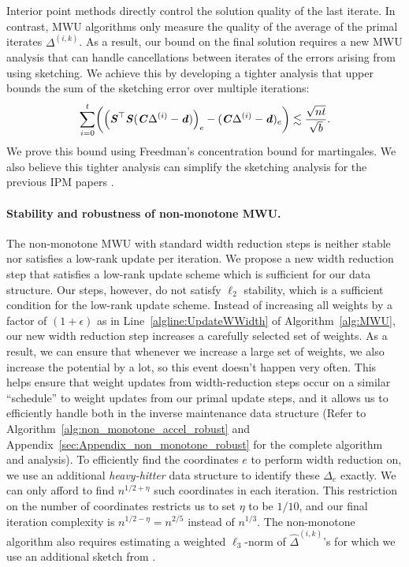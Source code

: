 \documentclass[11pt]{article}
\let\originalleft\left
\let\originalright\right
\renewcommand{\left}{\mathopen{}\mathclose\bgroup\originalleft}
\renewcommand{\right}{\aftergroup\egroup\originalright}
\newcommand\dd{\boldsymbol{\mathit{d}}}
\newcommand\CC{\boldsymbol{\mathit{C}}}
\renewcommand\SS{\boldsymbol{\mathit{S}}}
\newcommand{\wh}{\widehat}
\begin{document}
Interior point methods directly control the solution quality of the last iterate.
In contrast, MWU algorithms only 
measure the quality of the average of the primal iterates $\Delta^{(i,k)}$. 
As a result, our bound on the final solution requires a new MWU analysis that can handle cancellations between iterates of the errors arising from using sketching. 
We achieve this by developing a tighter analysis that upper bounds the sum of the sketching error over multiple iterations:
\[
\sum_{i=0}^t \left( \Big(\SS^{\top} \SS (\CC\Delta^{(i)}-\dd)\Big)_e - (\CC\Delta^{(i)}-\dd)_e\right) \lesssim \frac{\sqrt{n t}}{\sqrt{b}}.
\]
We prove this bound using Freedman's concentration bound for martingales. We also believe this tighter analysis can simplify the sketching analysis for the previous IPM papers \cite{cohen2021solving, lsz19, jiang2021faster}.



\paragraph{Stability and robustness of non-monotone MWU.}
The non-monotone MWU with standard width reduction steps is neither stable nor satisfies a low-rank update per iteration. We propose a new width reduction step that satisfies a low-rank update scheme which is sufficient for our data structure. Our steps, however, do not satisfy $\ell_2$ stability, which is a sufficient condition for the low-rank update scheme. Instead of increasing all weights by a factor of $(1+\epsilon)$ as in Line~\ref{algline:UpdateWWidth} of Algorithm~\ref{alg:MWU}, our new width reduction step increases a carefully selected set of weights. As a result, we can ensure that whenever we increase a large set of weights, we also increase the potential by a lot, so this event doesn't happen very often. This helps ensure that weight updates from width-reduction steps occur on a similar ``schedule'' to weight updates from our primal update steps, and it allows us to efficiently handle both in the inverse maintenance data structure (Refer to Algorithm~\ref{alg:non_monotone_accel_robust} and Appendix~\ref{sec:Appendix_non_monotone_robust} for the complete algorithm and analysis).
To efficiently find the coordinates $e$ to perform width reduction on, we use an additional {\it heavy-hitter} data structure to identify these $\Delta_e$ exactly. We can only afford to find $n^{1/2+\eta}$ such coordinates in each iteration. This restriction on the number of coordinates restricts us to set $\eta$ to be $1/10$, and our final iteration complexity is $n^{1/2-\eta} = n^{2/5}$ instead of $n^{1/3}$. The non-monotone algorithm also requires estimating a weighted $\ell_3$-norm of $\wh{\Delta}^{(i,k)}$'s for which we use an additional sketch from \cite{wz13}.
\end{document}
